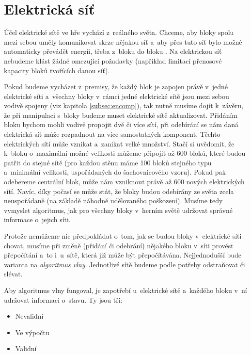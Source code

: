 

\section{Elektrická síť}
\label{sec:energyNet}
Účel elektrické sítě ve hře vychází z~reálného světa. Chceme, aby bloky spolu mezi sebou uměly komunikovat skrze nějakou síť a~aby přes tuto síť bylo možné automaticky převádět energii, třeba z~bloku  do bloku . Na elektrickou síť nebudeme klást žádné omezující požadavky (například limitací přenosové kapacity bloků tvořících danou síť).

Pokud budeme vycházet z~premisy, že každý blok je zapojen právě v~jedné elektrické síti a~všechny bloky v~rámci jedné elektrické sítě jsou mezi sebou vodivě spojeny (viz kapitola \ref{subsec:encomp}), tak nutně musíme dojít k~závěru, že při manipulaci s~bloky budeme muset elektrické sítě aktualizovat. Přidáním bloku bychom mohli vodivě propojit dvě či více sítí, při odebírání se nám daná elektrická síť může rozpadnout na více samostatných komponent. Těchto elektrických sítí může vznikat a~zanikat velké množství. Stačí si uvědomit, že k~bloku  o~maximální možné velikosti můžeme připojit až 600 bloků, které budou patřit do stejné sítě (pro každou stěnu máme 100 bloků stejného typu a~minimální velikosti, uspořádaných do šachovnicového vzoru). Pokud pak odebereme centrální blok, může nám vzniknout právě až 600 nových elektrických sítí. Navíc, díky počasí se může stát, že bloky budou odebírány ze světa zcela neuspořádaně (na základě náhodně udělovaného poškození). Musíme tedy vymyslet algoritmus, jak pro všechny bloky v~herním světě udržovat správné informace o~jejich síti.

Protože nemůžeme nic předpokládat o~tom, jak se budou bloky v~elektrické síti chovat, musíme při změně (přidání či odebrání) nějakého bloku v~síti provést přepočítání a~to i~u~sítě, která již může být přepočítávána. Nejjednodušší bude varianta na \textit{algoritmus vlny}. Jednotlivé sítě budeme podle potřeby odstraňovat či slévat. 


Aby algoritmus vlny fungoval, je zapotřebí u~elektrické sítě a~každého bloku v~ní udržovat informaci o~stavu. Ty jsou tři:
\begin{itemize}
	\item Nevalidní
	\item Ve výpočtu
	\item Validní
\end{itemize}

